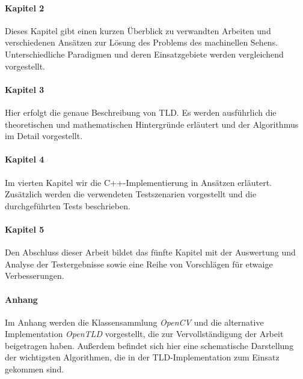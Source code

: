 \paragraph{Kapitel 2}
  Dieses Kapitel gibt einen kurzen Überblick zu verwandten Arbeiten und verschiedenen Ansätzen zur Lösung des Problems des machinellen Sehens. Unterschiedliche Paradigmen und deren Einsatzgebiete werden vergleichend vorgestellt.

\paragraph{Kapitel 3 }
  Hier erfolgt die genaue Beschreibung von TLD. Es werden ausführlich die theoretischen und mathematischen Hintergründe erläutert und der Algorithmus im Detail vorgestellt.

\paragraph{Kapitel 4}
	Im vierten Kapitel wir die C++-Implementierung in Ansätzen erläutert. Zusätzlich werden die verwendeten Testszenarien vorgestellt und die durchgeführten Tests beschrieben.

\paragraph{Kapitel 5}
	Den Abschluss dieser Arbeit bildet das fünfte Kapitel mit der Auswertung und Analyse der Testergebnisse sowie eine Reihe von Vorschlägen für etwaige Verbesserungen.

\paragraph{Anhang}
	Im Anhang werden die Klassensammlung { \em OpenCV} und die alternative Implementation { \em OpenTLD} vorgestellt, die zur Vervollständigung der Arbeit beigetragen haben. Außerdem befindet sich hier eine schematische Darstellung der wichtigsten Algorithmen, die in der TLD-Implementation zum Einsatz gekommen sind.